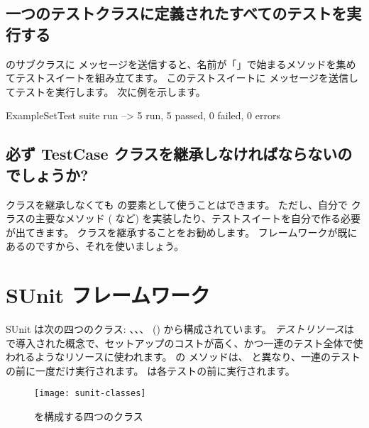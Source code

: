 \documentclass[a4paper,10pt,twoside]{book}
\begin{document}
\subsection{一つのテストクラスに定義されたすべてのテストを実行する}

 のサブクラスに  メッセージを送信すると、名前が「」で始まるメソッドを集めてテストスイートを組み立てます。
このテストスイートに  メッセージを送信してテストを実行します。
次に例を示します。

\begin{code}{}
ExampleSetTest suite run --> 5 run, 5 passed, 0 failed, 0 errors
\end{code}

\subsection{必ず TestCase クラスを継承しなければならないのでしょうか?}

 クラスを継承しなくても  の要素として使うことはできます。
ただし、自分で  クラスの主要なメソッド ( など) を実装したり、テストスイートを自分で作る必要が出てきます。
 クラスを継承することをお勧めします。
フレームワークが既にあるのですから、それを使いましょう。


\section{SUnit フレームワーク}

SUnit は次の四つのクラス:
、、、 () から構成されています。
\emph{テストリソース}は  で導入された概念で、セットアップのコストが高く、かつ一連のテスト全体で使われるようなリソースに使われます。
 の  メソッドは、 と異なり、一連のテストの前に一度だけ実行されます。
 は各テストの前に実行されます。

\begin{figure}[htb]
  \begin{center}
		{\texttt{[image: sunit-classes]}}
	\caption{\SUnit を構成する四つのクラス}
  \end{center}
\end{figure}
\end{document}
